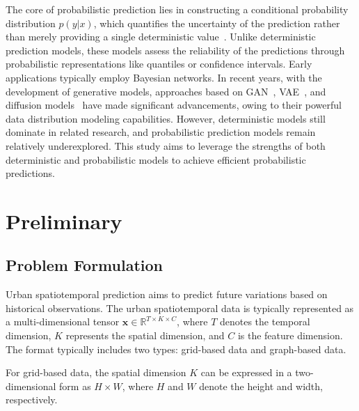 The core of probabilistic prediction lies in constructing a conditional probability distribution \( p(y|x) \), which quantifies the uncertainty of the prediction rather than merely providing a single deterministic value~\cite{yang2024survey,tashiro2021csdi}. Unlike deterministic prediction models, these models 
assess the reliability of the predictions through probabilistic representations like quantiles or confidence intervals. Early applications typically employ Bayesian networks. In recent years, with the development of generative models, approaches based on GAN~\cite{jin2022gan,saxena2019d,zhang2021satp}, VAE~\cite{chen2021learning,de2022vehicles,zhou2020variational}, and diffusion models~\cite{tashiro2021csdi,chai2024diffusion,lin2024diffusion} have made significant advancements, owing to their powerful data distribution modeling capabilities. However, deterministic models still dominate in related research, and probabilistic prediction models remain relatively underexplored. This study aims to leverage the strengths of both deterministic and probabilistic models to achieve efficient probabilistic predictions.



\section{Preliminary}
\subsection{Problem Formulation}
Urban spatiotemporal prediction aims to predict future variations based on historical observations. The urban spatiotemporal data is typically represented as a multi-dimensional tensor \(\mathbf{x} \in \mathbb{R}^{T \times K \times C}\), where \(T\) denotes the temporal dimension, \(K\) represents the spatial dimension, and \(C\) is the feature dimension. The format typically includes two types: grid-based data and graph-based data.



For grid-based data, the spatial dimension \(K\) can be expressed in a two-dimensional form as \(H\times W\), where \(H\) and \(W\) denote the height and width, respectively. 


